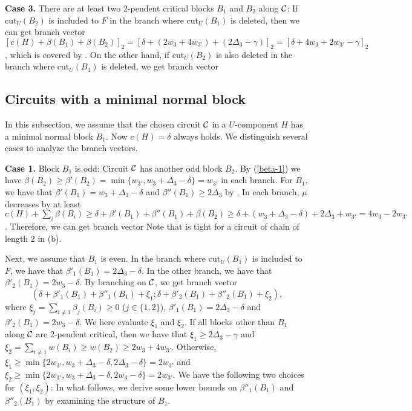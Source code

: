 \documentclass[runningheads]{llncs}
\begin{document}
{\bf Case 3.} There are at least two 2-pendent critical blocks $B_1$ and $B_2$ along ${\cal C}$:
If $\mathrm{cut}_U(B_2)$ is included to $F$ in the branch where $\mathrm{cut}_U(B_1)$ is deleted,
then we can get branch vector
$ [c(H)+\beta(B_1)+\beta(B_2)]_2=[\delta+(2w_3+4w_{3'})+(2\Delta_{3}-\gamma)]_2=[\delta+4w_3+2w_{3'}-\gamma]_2$, which is covered by .
On the other hand, if $\mathrm{cut}_U(B_2)$ is also deleted in the branch where $\mathrm{cut}_U(B_1)$ is deleted, we get branch vector


\subsection{Circuits with a minimal normal block}
In this subsection, we assume that the chosen circuit ${\cal C}$ in a $U$-component $H$
has a minimal normal block $B_1$. Now $c(H)=\delta$ always holds.
We distinguish several cases to analyze the branch vectors.


{\bf Case 1.} Block $B_1$ is odd: Circuit  ${\cal C}$ has another odd block $B_2$.
By (\ref{beta-1}) we have  $\beta(B_2)\geq \beta'(B_2)=\min\{w_{3'}, w_3\!+\!\Delta_3 \!-\!\delta\}= w_{3'}$
  in each branch.
For $B_1$, we have that
$\beta'(B_1)=w_3+\Delta_3 -\delta$ and $\beta''(B_1)\geq 2\Delta_3$ by .
In each branch,  $\mu$  decreases by at least
$c(H)+\sum_i \beta(B_i)\geq \delta+ \beta'(B_1)+ \beta''(B_1)+\beta(B_2)\geq \delta + (w_3+\Delta_3 -\delta)+ 2\Delta_3+w_{3'}=4w_3-2w_{3'}$.
Therefore, we can get
branch vector
Note that  is tight for a circuit of chain of length 2 in (b).

\bigskip
Next, we assume that $B_1$ is even.
In the branch where $\mathrm{cut}_U(B_1)$ is included to $F$, we have that $\beta'_1(B_1)=2\Delta_3-\delta$.
In the other branch, we have that $\beta'_2(B_1)=2w_3-\delta$.
By branching on ${\cal C}$, we get branch vector
$$ (\delta+\beta'_1(B_1)+\beta''_1(B_1)+\xi_1; \delta+\beta'_2(B_1)+\beta''_2(B_1)+\xi_2),
$$
where $\xi_j=\sum_{i\neq1} \beta_j(B_i)\geq 0$ ($j\in \{1,2\}$), $\beta'_1(B_1)=2\Delta_3-\delta$ and $\beta'_2(B_1)=2w_3-\delta$.
We here evaluate $\xi_1$ and $\xi_2$.
If all blocks other than $B_1$ along ${\cal C}$ are 2-pendent critical, then we have that $\xi_1\geq 2\Delta_3-\gamma$ and $\xi_2=\sum_{i\neq 1}w(B_i)\geq w(B_2)\geq 2w_3+4w_{3'}$.
Otherwise, $\xi_1\geq \min \{2w_{3'}, w_3+\Delta_3-\delta, 2\Delta_3-\delta \}
=2w_{3'}$ and $\xi_2\geq \min \{2w_{3'}, w_3+\Delta_3-\delta, 2w_3-\delta \}=2w_{3'}$.
We have the following two choices for $(\xi_1 , \xi_2)$:
In what follows,   we derive some lower bounds on $\beta''_1(B_1)$ and $\beta''_2(B_1)$
by examining the structure of $B_1$.
\end{document}
